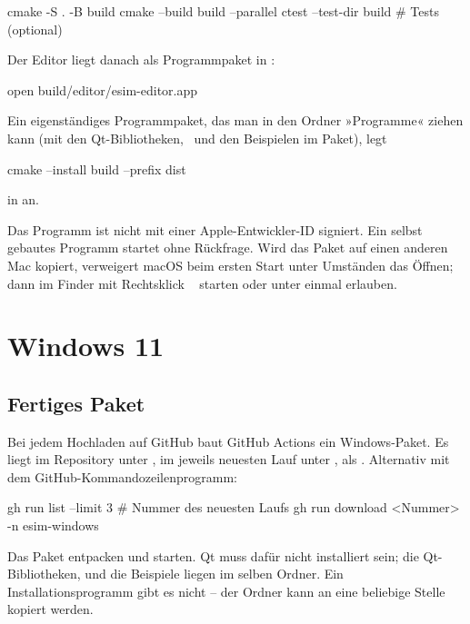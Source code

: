 \begin{shell}
cmake -S . -B build
cmake --build build --parallel
ctest --test-dir build                 # Tests (optional)
\end{shell}

Der Editor liegt danach als Programmpaket in
:

\begin{shell}
open build/editor/esim-editor.app
\end{shell}

Ein eigenständiges Programmpaket, das man in den Ordner »Programme« ziehen
kann (mit den Qt-Bibliotheken, \esim\ und den Beispielen im Paket), legt

\begin{shell}
cmake --install build --prefix dist
\end{shell}

in  an.

\begin{hinweis}[Gatekeeper]
  Das Programm ist nicht mit einer Apple-Entwickler-ID signiert. Ein selbst
  gebautes Programm startet ohne Rückfrage. Wird das Paket auf einen
  anderen Mac kopiert, verweigert macOS beim ersten Start unter Umständen das
  Öffnen; dann im Finder mit Rechtsklick \pfad\  starten oder
  unter \pfad{}
  einmal erlauben.
\end{hinweis}

\section{Windows 11}

\subsection{Fertiges Paket}

Bei jedem Hochladen auf GitHub baut GitHub Actions ein Windows-Paket. Es
liegt im Repository unter , im jeweils neuesten Lauf unter
, als . Alternativ mit dem
GitHub-Kommandozeilenprogramm:

\begin{shell}
gh run list --limit 3                    # Nummer des neuesten Laufs
gh run download <Nummer> -n esim-windows
\end{shell}

Das Paket entpacken und  starten. Qt muss dafür nicht
installiert sein; die Qt-Bibliotheken,  und die Beispiele
liegen im selben Ordner. Ein Installationsprogramm gibt es nicht – der
Ordner kann an eine beliebige Stelle kopiert werden.

